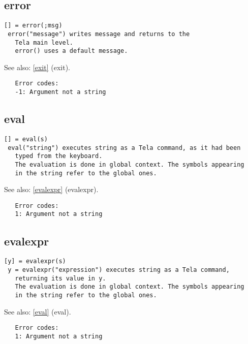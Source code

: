 \documentclass[a4paper]{article}
\begin{document}
\subsection{error\label{error}}

\begin{tscreen}
\begin{verbatim}
[] = error(;msg)
 error("message") writes message and returns to the
   Tela main level.
   error() uses a default message.
\end{verbatim}

See also: \ref{exit} {(exit)}.
\begin{verbatim}
   Error codes:
   -1: Argument not a string
\end{verbatim}
\end{tscreen}





\subsection{eval\label{eval}}

\begin{tscreen}
\begin{verbatim}
[] = eval(s)
 eval("string") executes string as a Tela command, as it had been
   typed from the keyboard.
   The evaluation is done in global context. The symbols appearing
   in the string refer to the global ones.
\end{verbatim}

See also: \ref{evalexpr} {(evalexpr)}.
\begin{verbatim}
   Error codes:
   1: Argument not a string 
\end{verbatim}
\end{tscreen}





\subsection{evalexpr\label{evalexpr}}

\begin{tscreen}
\begin{verbatim}
[y] = evalexpr(s)
 y = evalexpr("expression") executes string as a Tela command,
   returning its value in y.
   The evaluation is done in global context. The symbols appearing
   in the string refer to the global ones.
\end{verbatim}

See also: \ref{eval} {(eval)}.
\begin{verbatim}
   Error codes:
   1: Argument not a string 
\end{verbatim}
\end{tscreen}
\end{document}
